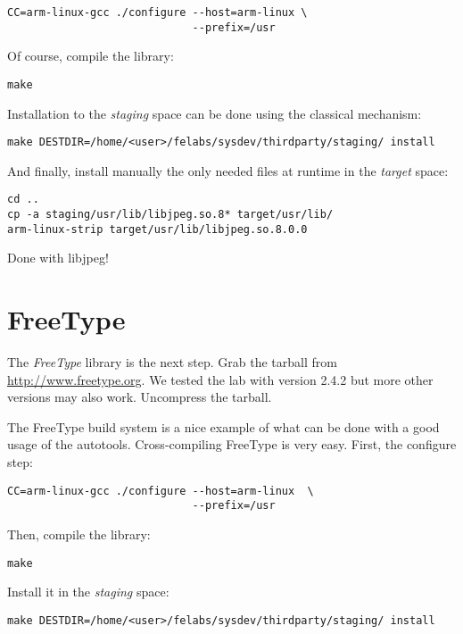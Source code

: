\begin{verbatim}
CC=arm-linux-gcc ./configure --host=arm-linux \
                             --prefix=/usr
\end{verbatim}

Of course, compile the library:

\begin{verbatim}
make
\end{verbatim}

Installation to the {\em staging} space can be done using the
classical  mechanism:

\begin{verbatim}
make DESTDIR=/home/<user>/felabs/sysdev/thirdparty/staging/ install
\end{verbatim}

And finally, install manually the only needed files at runtime in the
{\em target} space:

\begin{verbatim}
cd ..
cp -a staging/usr/lib/libjpeg.so.8* target/usr/lib/
arm-linux-strip target/usr/lib/libjpeg.so.8.0.0
\end{verbatim}

Done with libjpeg!

\section{FreeType}

The {\em FreeType} library is the next step. Grab the tarball from
\url{http://www.freetype.org}. We tested the lab with version 2.4.2
but more other versions may also work. Uncompress the tarball.

The FreeType build system is a nice example of what can be done with a
good usage of the autotools. Cross-compiling FreeType is very
easy. First, the configure step:

\begin{verbatim}
CC=arm-linux-gcc ./configure --host=arm-linux  \
                             --prefix=/usr
\end{verbatim}

Then, compile the library:

\begin{verbatim}
make
\end{verbatim}

Install it in the {\em staging} space:

\begin{verbatim}
make DESTDIR=/home/<user>/felabs/sysdev/thirdparty/staging/ install
\end{verbatim}

